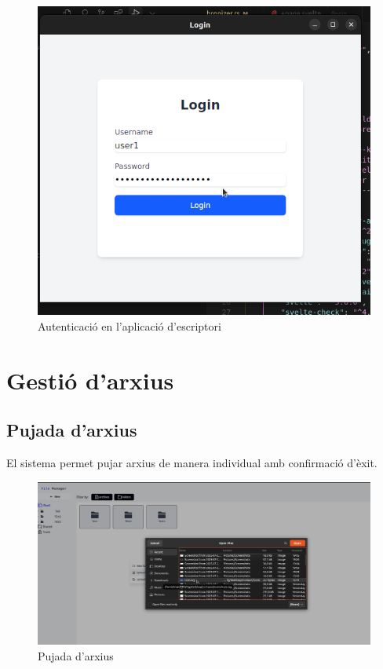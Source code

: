 \begin{figure}[H]
\centering
\includegraphics[width=0.7\linewidth]{Figures/implementacio/loginDesktop.png}
\caption{Autenticació en l'aplicació d'escriptori}
\label{fig:loginDesktop}
\end{figure}

\section{Gestió d'arxius}

\subsection{Pujada d'arxius}

El sistema permet pujar arxius de manera individual amb confirmació d'èxit.

\begin{figure}[H]
\centering
\includegraphics[width=0.8\linewidth]{Figures/implementacio/uploadFile.png}
\caption{Pujada d'arxius}
\label{fig:uploadFile}
\end{figure}

